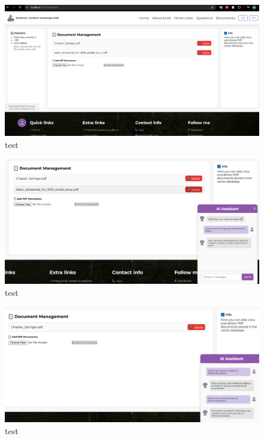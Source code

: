 \documentclass[]{foi}
\begin{document}
\begin{figure}[ht]
  \centering
  \includegraphics[width=1\textwidth]{./assets/documents.png}
  \caption{test}
  \label{fig:slika98}
\end{figure}

\begin{figure}[ht]
  \centering
  \includegraphics[width=1\textwidth]{./assets/asistent1.png}
  \caption{test}
  \label{fig:slika99}
\end{figure}

\begin{figure}[ht]
  \centering
  \includegraphics[width=1\textwidth]{./assets/asistent2.png}
  \caption{test}
  \label{fig:slika100}
\end{figure}
\end{document}
